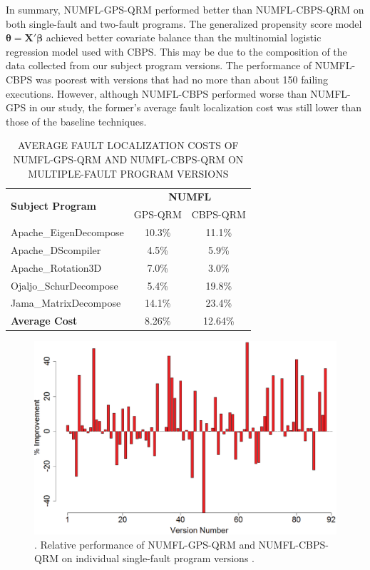 \documentclass[times]{stvrauth}
\begin{document}
In summary, NUMFL-GPS-QRM performed better than NUMFL-CBPS-QRM on both single-fault and two-fault programs.  The generalized propensity score model $\pmb{\theta}=\pmb{X}'\pmb{\beta}$ achieved better covariate balance than the multinomial logistic regression model used with CBPS.  This may be due to the composition of the data collected from our subject program versions.  The performance of NUMFL-CBPS was poorest with versions that had no more than about 150 failing executions.  However, although NUMFL-CBPS performed worse than NUMFL-GPS in our study, the former's average fault localization cost was still lower than those of the baseline techniques.

\begin{table}[htbp!]
\caption{AVERAGE FAULT LOCALIZATION COSTS OF NUMFL-GPS-QRM AND NUMFL-CBPS-QRM ON MULTIPLE-FAULT PROGRAM VERSIONS}
\label{table6}
\centering
      \begin{tabular}{|l|c|c|}
      \hline
\multirow{2}{*}{{\bf Subject Program}}	&	\multicolumn{2}{|c|}{{\bf NUMFL}}	\\	\cline{2-3}
&  GPS-QRM	&CBPS-QRM \\ \hline
Apache\_EigenDecompose	&	10.3\%	&	11.1\%	\\	\hline
Apache\_DScompiler	&	4.5\%	&	5.9\%	\\	\hline
Apache\_Rotation3D	&	7.0\%	&	3.0\%	\\	\hline
Ojaljo\_SchurDecompose	&	5.4\%	&	19.8\%	\\	\hline
Jama\_MatrixDecompose	&	14.1\%	&	23.4\%	\\	\hline
{\bf Average Cost} & 8.26\% &12.64\%\\ \hline
\end{tabular}
\end{table}

\begin{figure}[!thpb]
\centering
\includegraphics[width=\textwidth]{CBPS_VS_GPS.eps}
\caption{. Relative performance of NUMFL-GPS-QRM and NUMFL-CBPS-QRM on individual single-fault program versions .}
\label{CBPS_VS_GPS}
\end{figure}
\end{document}
